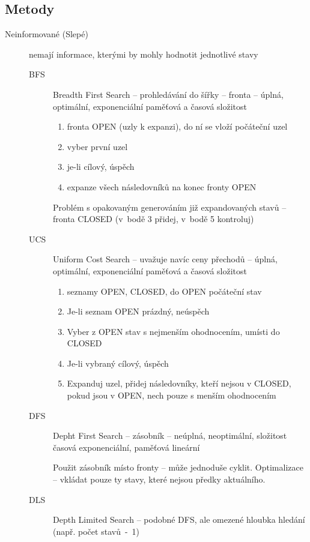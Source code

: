 \documentclass[a4paper, 11pt]{report}
\begin{document}
\subsection{Metody}
\begin{description}
	\item[Neinformované (Slepé)] nemají informace, kterými by mohly hodnotit jednotlivé stavy
	\begin{description}
		\item[BFS] Breadth First Search -- prohledávání do šířky -- fronta -- úplná, optimální, exponenciální paměťová a časová složitost
		\begin{enumerate}
			\item fronta OPEN (uzly k expanzi), do ní se vloží počáteční uzel
			\item vyber první uzel
			\item je-li cílový, úspěch
			\item expanze všech následovníků na konec fronty OPEN
		\end{enumerate}
		Problém s opakovaným generováním již expandovaných stavů -- fronta CLOSED (v~bodě 3 přidej, v~bodě 5 kontroluj)
		
		\item[UCS] Uniform Cost Search -- uvažuje navíc ceny přechodů -- úplná, optimální, exponenciální paměťová a časová složitost
		\begin{enumerate}
			\item seznamy OPEN, CLOSED, do OPEN počáteční stav
			\item Je-li seznam OPEN prázdný, neúspěch
			\item Vyber z OPEN stav s nejmenším ohodnocením, umísti do CLOSED
			\item Je-li vybraný cílový, úspěch
			\item Expanduj uzel, přidej následovníky, kteří nejsou v CLOSED, pokud jsou v OPEN, nech pouze s menším ohodnocením
		\end{enumerate}
		
		\item[DFS] Depht First Search -- zásobník -- neúplná, neoptimální, složitost časová exponenciální, paměťová lineární
		
		Použit zásobník místo fronty -- může jednoduše cyklit. Optimalizace -- vkládat pouze ty stavy, které nejsou předky aktuálního.
		
		\item[DLS] Depth Limited Search -- podobné DFS, ale omezené hloubka hledání (např. počet stavů~-~1)
		

\end{description}
\end{description}
\end{document}
